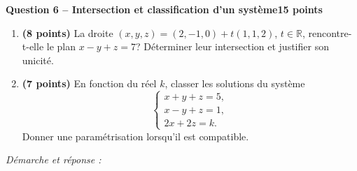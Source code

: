 \documentclass[11pt,a4paper]{article}
\begin{document}
\newpage
{\large\bfseries Question 6 -- Intersection et classification d’un système}\hfill\textbf{15 points}\par
\begin{enumerate}
\item \textbf{(8 points)} La droite \((x,y,z)=(2,-1,0)+t(1,1,2)\), \(t\in\mathbb R\), rencontre-t-elle le plan \(x-y+z=7\)? Déterminer leur intersection et justifier son unicité.
\item \textbf{(7 points)} En fonction du réel \(k\), classer les solutions du système \[\begin{cases}x+y+z=5,\\x-y+z=1,\\2x+2z=k.\end{cases}\] Donner une paramétrisation lorsqu’il est compatible.
\end{enumerate}
\vspace{3mm}\textit{Démarche et réponse :}\par\vfill
\end{document}
